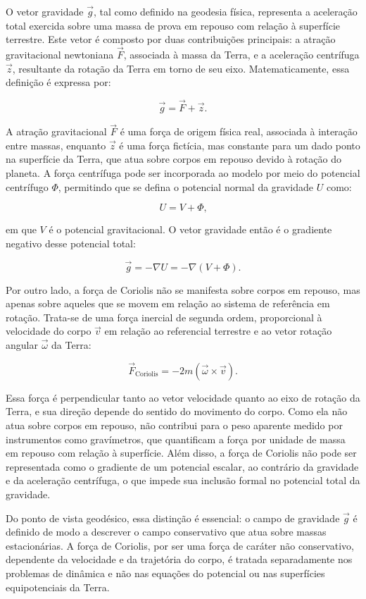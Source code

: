 O vetor gravidade \( \vec{g} \), tal como definido na geodesia física, representa a aceleração total exercida sobre uma massa de prova em repouso com relação à superfície terrestre. Este vetor é composto por duas contribuições principais: a atração gravitacional newtoniana \( \vec{F} \), associada à massa da Terra, e a aceleração centrífuga \( \vec{z} \), resultante da rotação da Terra em torno de seu eixo. Matematicamente, essa definição é expressa por:

\[
\vec{g} = \vec{F} + \vec{z} \text{.}
\]

A atração gravitacional \( \vec{F} \) é uma força de origem física real, associada à interação entre massas, enquanto \( \vec{z} \) é uma força fictícia, mas constante para um dado ponto na superfície da Terra, que atua sobre corpos em repouso devido à rotação do planeta. A força centrífuga pode ser incorporada ao modelo por meio do potencial centrífugo \( \Phi \), permitindo que se defina o potencial normal da gravidade \( U \) como:

\[
U = V + \Phi \text{,}
\]

em que \( V \) é o potencial gravitacional. O vetor gravidade então é o gradiente negativo desse potencial total:

\[
\vec{g} = -\nabla U = -\nabla(V + \Phi) \text{.}
\]

Por outro lado, a força de Coriolis não se manifesta sobre corpos em repouso, mas apenas sobre aqueles que se movem em relação ao sistema de referência em rotação. Trata-se de uma força inercial de segunda ordem, proporcional à velocidade do corpo \( \vec{v} \) em relação ao referencial terrestre e ao vetor rotação angular \( \vec{\omega} \) da Terra:

\[
\vec{F}_\text{Coriolis} = -2m (\vec{\omega} \times \vec{v}) \text{.}
\]

Essa força é perpendicular tanto ao vetor velocidade quanto ao eixo de rotação da Terra, e sua direção depende do sentido do movimento do corpo. Como ela não atua sobre corpos em repouso, não contribui para o peso aparente medido por instrumentos como gravímetros, que quantificam a força por unidade de massa em repouso com relação à superfície. Além disso, a força de Coriolis não pode ser representada como o gradiente de um potencial escalar, ao contrário da gravidade e da aceleração centrífuga, o que impede sua inclusão formal no potencial total da gravidade.

Do ponto de vista geodésico, essa distinção é essencial: o campo de gravidade \( \vec{g} \) é definido de modo a descrever o campo conservativo que atua sobre massas estacionárias. A força de Coriolis, por ser uma força de caráter não conservativo, dependente da velocidade e da trajetória do corpo, é tratada separadamente nos problemas de dinâmica e não nas equações do potencial ou nas superfícies equipotenciais da Terra.

